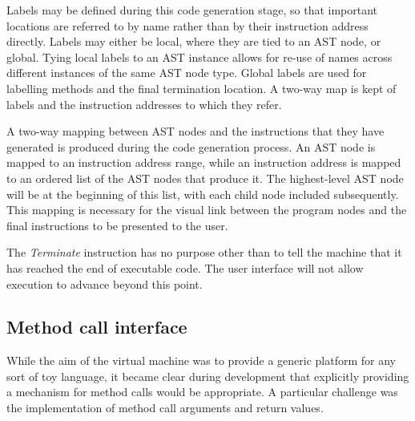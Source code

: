 Labels may be defined during this code generation stage, so that important locations are referred to by name rather than by their instruction address directly. Labels may either be local, where they are tied to an AST node, or global. Tying local labels to an AST instance allows for re-use of names across different instances of the same AST node type. Global labels are used for labelling methods and the final termination location. A two-way map is kept of labels and the instruction addresses to which they refer. 

A two-way mapping between AST nodes and the instructions that they have generated is produced during the code generation process. An AST node is mapped to an instruction address range, while an instruction address is mapped to an ordered list of the AST nodes that produce it. The highest-level AST node will be at the beginning of this list, with each child node included subsequently. This mapping is necessary for the visual link between the program nodes and the final instructions to be presented to the user.

The \textit{Terminate} instruction has no purpose other than to tell the machine that it has reached the end of executable code. The user interface will not allow execution to advance beyond this point. 

\subsection{Method call interface}

While the aim of the virtual machine was to provide a generic platform for any sort of toy language, it became clear during development that explicitly providing a mechanism for method calls would be appropriate. A particular challenge was the implementation of method call arguments and return values.

